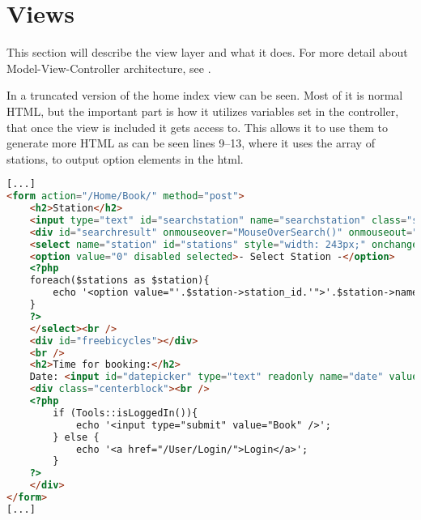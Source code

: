 \section{Views}
This section will describe the view layer and what it does. For more detail about Model-View-Controller architecture, see .

In  a truncated version of the home index view can be seen. Most of it is normal HTML, but the important part is how it utilizes variables set in the controller, that once the view is included it gets access to. This allows it to use them to generate more HTML as can be seen lines 9--13, where it uses the array of stations, to output option elements in the html.

\begin{lstlisting}[language=html, label=lst:homeIndexView, caption={Home Index View}]
[...]
<form action="/Home/Book/" method="post">
    <h2>Station</h2>
    <input type="text" id="searchstation" name="searchstation" class="searchbox" placeholder="Search Station" oninput="SearchStation();MouseOverSearch();" onfocus="ShowSearch();MouseOverSearch();" onmouseover="ShowSearch();MouseOverSearch();" onmouseout="MouseLeaveSearch()" autocomplete="off" /><br />
    <div id="searchresult" onmouseover="MouseOverSearch()" onmouseout="MouseLeaveSearch()"></div>
    <select name="station" id="stations" style="width: 243px;" onchange="UpdateMarker()">
    <option value="0" disabled selected>- Select Station -</option>
    <?php
    foreach($stations as $station){
        echo '<option value="'.$station->station_id.'">'.$station->name.'</option>';
    }
    ?>
    </select><br />
    <div id="freebicycles"></div>
    <br />
    <h2>Time for booking:</h2>
    Date: <input id="datepicker" type="text" readonly name="date" value="<?php echo ViewHelper::printDate(); ?>" style="width: 75px; text-align: center;" /> Time: <input id="hourpicker" type="text" readonly name="hour" value="<?php echo ViewHelper::printHour(); ?>" style="width: 25px; text-align: center;" />:<input id="minutepicker" type="text" readonly name="minute" value="<?php echo ViewHelper::printMinute(); ?>" style="width: 25px;  text-align: center;" />
    <div class="centerblock"><br />
    <?php
        if (Tools::isLoggedIn()){
            echo '<input type="submit" value="Book" />';
        } else {
            echo '<a href="/User/Login/">Login</a>';
        }
    ?>
    </div>
</form>
[...]
\end{lstlisting}